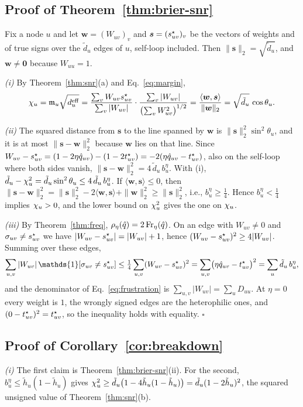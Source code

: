 \subsection{Proof of Theorem~\ref{thm:brier-snr}}
Fix a node $u$ and let $\bm w=(W_{uv})_v$ and $\bm s=(s^{\star}_{uv})_v$ be the vectors of weights and of true signs over the $\tilde d_u$ edges of $u$, self-loop included.
Then $\|\bm s\|_2=\sqrt{\tilde d_u}$, and $\bm w\neq\bm 0$ because $W_{uu}=1$.

\emph{(i)} By Theorem~\ref{thm:snr}(a) and Eq.~\eqref{eq:margin},
\[
\chi_u=\mathfrak{m}_u\sqrt{d^{\mathrm{eff}}_u}=\frac{\sum_vW_{uv}s^{\star}_{uv}}{\sum_v|W_{uv}|}\cdot\frac{\sum_v|W_{uv}|}{\bigl(\sum_vW_{uv}^2\bigr)^{1/2}}
=\frac{\langle\bm w,\bm s\rangle}{\|\bm w\|_2}=\sqrt{\tilde d_u}\,\cos\theta_u .
\]

\emph{(ii)} The squared distance from $\bm s$ to the line spanned by $\bm w$ is $\|\bm s\|_2^2\sin^2\theta_u$, and it is at most $\|\bm s-\bm w\|_2^2$ because $\bm w$ lies on that line.
Since $W_{uv}-s^{\star}_{uv}=(1-2\eta\hat q_{uv})-(1-2t^{\star}_{uv})=-2(\eta\hat q_{uv}-t^{\star}_{uv})$, also on the self-loop where both sides vanish, $\|\bm s-\bm w\|_2^2=4\,\tilde d_u\,b^{\eta}_u$.
With (i), $\tilde d_u-\chi_u^2=\tilde d_u\sin^2\theta_u\le4\,\tilde d_u\,b^{\eta}_u$.
If $\langle\bm w,\bm s\rangle\le0$, then $\|\bm s-\bm w\|_2^2=\|\bm s\|_2^2-2\langle\bm w,\bm s\rangle+\|\bm w\|_2^2\ge\|\bm s\|_2^2$, i.e., $b^{\eta}_u\ge\tfrac14$.
Hence $b^{\eta}_u<\tfrac14$ implies $\chi_u>0$, and the lower bound on $\chi_u^2$ gives the one on $\chi_u$.

\emph{(iii)} By Theorem~\ref{thm:freq}, $\rho_\eta(\hat q)=2\operatorname{Fr}_\eta(\hat q)$.
On an edge with $W_{uv}\neq0$ and $\sigma_{uv}\neq s^{\star}_{uv}$ we have $|W_{uv}-s^{\star}_{uv}|=|W_{uv}|+1$, hence $(W_{uv}-s^{\star}_{uv})^2\ge4|W_{uv}|$.
Summing over these edges,
\[
\sum_{u,v}|W_{uv}|\,\mathds{1}[\sigma_{uv}\neq\sstar_{uv}]\le\tfrac14\sum_{u,v}(W_{uv}-\sstar_{uv})^2=\sum_{u,v}\bigl(\eta\hat q_{uv}-\tstar_{uv}\bigr)^2=\sum_u\tilde d_u\,b^{\eta}_u ,
\]
and the denominator of Eq.~\eqref{eq:frustration} is $\sum_{u,v}|W_{uv}|=\sum_uD_{uu}$.
At $\eta=0$ every weight is $1$, the wrongly signed edges are the heterophilic ones, and $(0-t^{\star}_{uv})^2=t^{\star}_{uv}$, so the inequality holds with equality.
\hfill$\square$

\subsection{Proof of Corollary~\ref{cor:breakdown}}
\emph{(i)} The first claim is Theorem~\ref{thm:brier-snr}(ii).
For the second, $b^{\eta}_u\le\tilde h_u(1-\tilde h_u)$ gives $\chi_u^2\ge\tilde d_u\bigl(1-4\tilde h_u(1-\tilde h_u)\bigr)=\tilde d_u(1-2\tilde h_u)^2$, the squared unsigned value of Theorem~\ref{thm:snr}(b).

